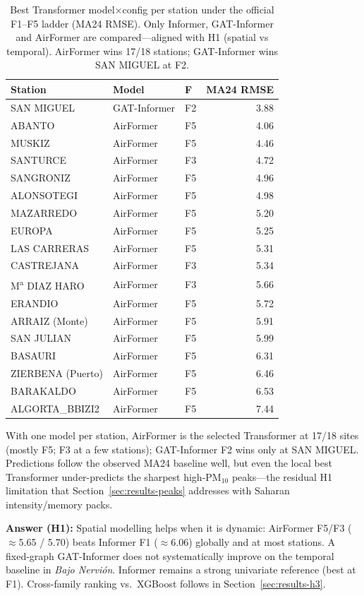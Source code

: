 \documentclass[11pt]{article}
\newcommand{\revnew}[1]{\textcolor{orange!75!black}{#1}}
\begin{document}
\begin{table}[ht]
\centering
\caption{Best Transformer model$\times$config per station under the official F1--F5 ladder (MA24 RMSE). Only Informer, GAT-Informer and AirFormer are compared---aligned with H1 (spatial vs temporal). AirFormer wins 17/18 stations; GAT-Informer wins SAN MIGUEL at F2.}
\label{tab:best-station}
\footnotesize
\begin{tabular}{@{}lllr@{}}
\toprule
Station & Model & F & MA24 RMSE \\
\midrule
SAN MIGUEL & GAT-Informer & F2 & 3.88 \\
ABANTO & AirFormer & F5 & 4.06 \\
MUSKIZ & AirFormer & F5 & 4.46 \\
SANTURCE & AirFormer & F3 & 4.72 \\
SANGRONIZ & AirFormer & F5 & 4.96 \\
ALONSOTEGI & AirFormer & F5 & 4.98 \\
MAZARREDO & AirFormer & F5 & 5.20 \\
EUROPA & AirFormer & F5 & 5.25 \\
LAS CARRERAS & AirFormer & F5 & 5.31 \\
CASTREJANA & AirFormer & F3 & 5.34 \\
M\textsuperscript{a} DIAZ HARO & AirFormer & F3 & 5.66 \\
ERANDIO & AirFormer & F5 & 5.72 \\
ARRAIZ (Monte) & AirFormer & F5 & 5.91 \\
SAN JULIAN & AirFormer & F5 & 5.99 \\
BASAURI & AirFormer & F5 & 6.31 \\
ZIERBENA (Puerto) & AirFormer & F5 & 6.46 \\
BARAKALDO & AirFormer & F5 & 6.53 \\
ALGORTA\_BBIZI2 & AirFormer & F5 & 7.44 \\
\bottomrule
\end{tabular}
\end{table}

With one model per station, AirFormer is the selected Transformer at 17/18 sites (mostly F5; F3 at a few stations); GAT-Informer F2 wins only at SAN MIGUEL. Predictions follow the observed MA24 baseline well, but even the local best Transformer under-predicts the sharpest high-PM$_{10}$ peaks---the residual H1 limitation that Section~\ref{sec:results-peaks} addresses with Saharan intensity/memory packs.

\revnew{\textbf{Answer (H1):} Spatial modelling helps when it is dynamic: AirFormer F5/F3 ($\approx$5.65 / 5.70) beats Informer F1 ($\approx$6.06) globally and at most stations. A fixed-graph GAT-Informer does not systematically improve on the temporal baseline in \textit{Bajo Nervi\'on}. Informer remains a strong univariate reference (best at F1). Cross-family ranking vs.\ XGBoost follows in Section~\ref{sec:results-h3}.}
\end{document}
